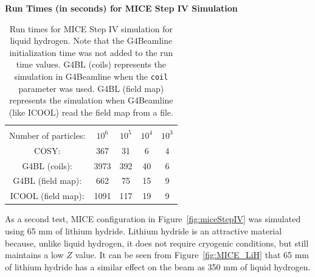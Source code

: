 \documentclass{jacow}
\begin{document}
\begin{table}
\caption*{\textbf{Run Times (in seconds) for MICE Step IV Simulation}}
\begin{center}
\begin{tabularx}{\columnwidth}{ccccc}
\hline \hline \vspace*{-10pt} \\
Number of particles: & $10^6$ & $10^5$ & $10^4$ & $10^3$\\
\hline
COSY: & 367 & 31 & 6 & 4\\
G4BL (coils): & 3973 & 392 & 40 & 6\\
G4BL (field map): & 662 & 75 & 15 & 9\\
ICOOL (field map): & 1091 & 117 & 19 & 9\\
\hline
\end{tabularx}
\end{center}
\caption[Run times for MICE Step IV simulation.]{Run times for MICE Step IV simulation for liquid hydrogen. Note that the G4Beamline initialization time was not added to the run time values. G4BL (coils) represents the simulation in G4Beamline when the \texttt{coil} parameter was used. G4BL (field map) represents the simulation when G4Beamline (like ICOOL) read the field map from a file.}
\label{tbl:mice_times}
\end{table}

As a second test, MICE configuration in Figure~\ref{fig:miceStepIV} was simulated using 65 mm of lithium hydride. Lithium hydride is an attractive material because, unlike liquid hydrogen, it does not require cryogenic conditions, but still maintains a low $Z$ value. It can be seen from Figure~\ref{fig:MICE_LiH} that 65 mm of lithium hydride has a similar effect on the beam as 350 mm of liquid hydrogen.
\end{document}
